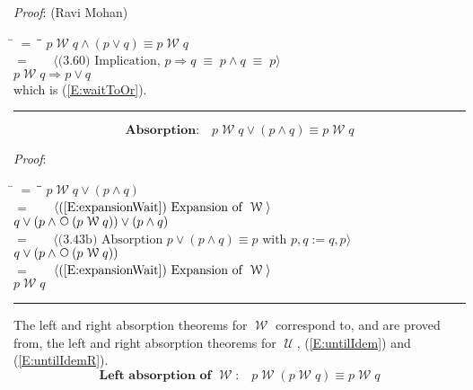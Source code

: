 \documentclass[12pt, fleqn, leqno]{article}
\newcommand{\lgap}{2pt}                             %
\newcommand{\mymathindent}{24pt}                    %
\newcommand{\equivs}{\ensuremath{\;\equiv\;}}       %
\newcommand{\impl}{\ensuremath{\Rightarrow}}        %
\newcommand{\Until}{\;\mathcal{U}\;}
\newcommand{\Wait}{\;\mathcal{W}\;}
\newcommand{\Next}{\;\,\text{\raisebox{3.5pt}{\circle{6}}}}
\newcommand{\myqed}{\rule[-.23ex]{1.2ex}{2.0ex}}
\newcommand{\myqedtab}{\hspace{384pt}}              %
\newcommand{\Gll} {\langle}                         %
\newcommand{\Ggg} {\rangle}                         %
\newcommand{\Hint}[1]     {\ \ \ $\Gll              \mbox{#1} \Ggg$ }   %
\begin{document}
\emph{Proof}: (Ravi Mohan)
\begin{tabbing}
\hspace{\mymathindent} \= $= \;$ \= \myqedtab \= \kill
\> \> $p\Wait q\land (p\lor q) \equiv p\Wait q$\\[\lgap]
\> $=$  \>  \Hint{(3.60) Implication, $p\impl q \equivs p\land q \equivs p$}\\[\lgap]
\> \> $p\Wait q\impl p\lor q$\\[\lgap]
\> which is (\ref{E:waitToOr}). \quad \myqed
\end{tabbing}
\begin{equation}\label{E:waitOrAnd}
\textbf{Absorption:}\quad p\Wait q\lor (p\land q) \equiv p\Wait q
\end{equation}

\emph{Proof}:
\begin{tabbing}
\hspace{\mymathindent} \= $= \;$ \= \myqedtab \= \kill
\> \> $p\Wait q\lor (p\land q)$\\[\lgap]
\> $=$ \> \Hint{(\ref{E:expansionWait}) Expansion of $\Wait$} \\[\lgap]
\> \> $q\lor (p\land \Next (p\Wait q)) \lor (p\land q)$\\[\lgap]
  \> $=$  \>  \Hint{(3.43b) Absorption $p \lor (p \land q) \equiv p$ with $p,q:=q,p$}\\[\lgap]
\> \> $q\lor (p\land \Next (p\Wait q))$\\[\lgap]
\> $=$ \> \Hint{(\ref{E:expansionWait}) Expansion of $\Wait$} \\[\lgap]
\> \> $p\Wait q$ \quad \myqed
\end{tabbing}

The left and right absorption theorems for $\Wait$ correspond to, and are proved from, the left and right absorption theorems
for $\Until$, (\ref{E:untilIdem}) and (\ref{E:untilIdemR}).
\begin{equation}\label{E:waitAbsL}
\textbf{Left absorption of $\Wait$:}\quad p \Wait (p \Wait q) \equiv p \Wait q
\end{equation}
\end{document}
